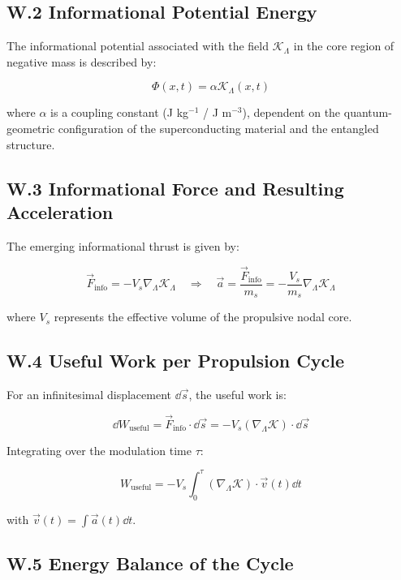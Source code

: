 \documentclass[12pt]{article}
\begin{document}
\subsection*{W.2 Informational Potential Energy}
The informational potential associated with the field $\mathcal{K}_\Lambda$ in the core region of negative mass is described by:

\[
\Phi(x,t) = \alpha \mathcal{K}_\Lambda(x,t)
\]

where $\alpha$ is a coupling constant (J kg$^{-1}$ / J m$^{-3}$), dependent on the quantum-geometric configuration of the superconducting material and the entangled structure.

\subsection*{W.3 Informational Force and Resulting Acceleration}

The emerging informational thrust is given by:

\[
\vec{F}_{\text{info}} = -V_s \nabla_\Lambda \mathcal{K}_\Lambda
\quad \Rightarrow \quad
\vec{a} = \frac{\vec{F}_{\text{info}}}{m_s} = -\frac{V_s}{m_s} \nabla_\Lambda \mathcal{K}_\Lambda
\]

where $V_s$ represents the effective volume of the propulsive nodal core.

\subsection*{W.4 Useful Work per Propulsion Cycle}

For an infinitesimal displacement $\dd{\vec{s}}$, the useful work is:

\[
\dd{W}_{\text{useful}} = \vec{F}_{\text{info}} \cdot \dd{\vec{s}} = -V_s (\nabla_\Lambda \mathcal{K}) \cdot \dd{\vec{s}}
\]

Integrating over the modulation time $\tau$:

\[
W_{\text{useful}} = -V_s \int_0^\tau (\nabla_\Lambda \mathcal{K}) \cdot \vec{v}(t) \dd{t}
\]

with $\vec{v}(t) = \int \vec{a}(t) \dd{t}$.

\subsection*{W.5 Energy Balance of the Cycle}
\end{document}
